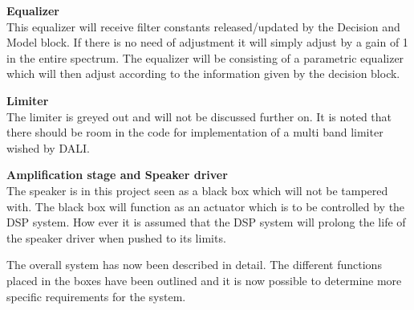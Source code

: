 \textbf{Equalizer} \\
This equalizer will receive filter constants released/updated by the Decision and Model block. If there is no need of adjustment it will simply adjust by a gain of 1 in the entire spectrum. The equalizer will be consisting of a parametric equalizer which will then adjust according to the information given by the decision block.

\textbf{Limiter} \\
The limiter is greyed out and will not be discussed further on. It is noted that there should be room in the code for implementation of a multi band limiter wished by DALI.

\textbf{Amplification stage and Speaker driver} \\
The speaker is in this project seen as a black box which will not be tampered with. The black box will function as an actuator which is to be controlled by the DSP system. How ever it is assumed that the DSP system will prolong the life of the speaker driver when pushed to its limits.


\vspace{5mm}
The overall system has now been described in detail. The different functions placed in the boxes have been outlined and it is now possible to determine more specific requirements for the system.
